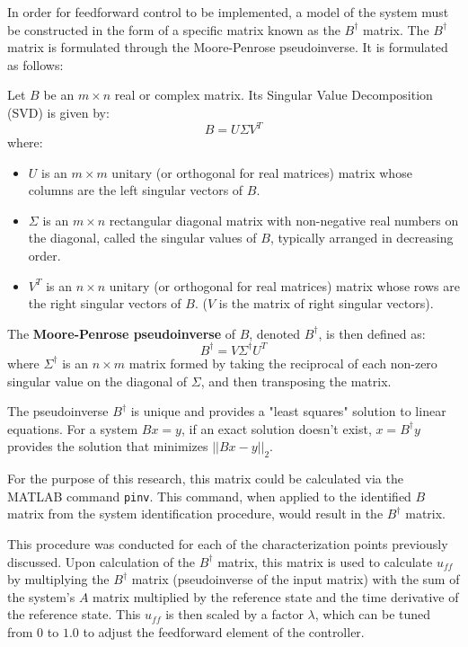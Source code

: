 In order for feedforward control to be implemented, a model of the system must be constructed in the form of a specific matrix known as the $B^\dagger$ matrix. The $B^\dagger$ matrix is formulated through the Moore-Penrose pseudoinverse. It is formulated as follows:

Let $B$ be an $m \times n$ real or complex matrix. Its Singular Value Decomposition (SVD) is given by:
$$B = U \Sigma V^T$$
where:
\begin{itemize}
    \item $U$ is an $m \times m$ unitary (or orthogonal for real matrices) matrix whose columns are the left singular vectors of $B$.
    \item $\Sigma$ is an $m \times n$ rectangular diagonal matrix with non-negative real numbers on the diagonal, called the singular values of $B$, typically arranged in decreasing order.
    \item $V^T$ is an $n \times n$ unitary (or orthogonal for real matrices) matrix whose rows are the right singular vectors of $B$. ($V$ is the matrix of right singular vectors).
\end{itemize}

The \textbf{Moore-Penrose pseudoinverse} of $B$, denoted $B^\dagger$, is then defined as:
$$B^\dagger = V \Sigma^\dagger U^T$$
where $\Sigma^\dagger$ is an $n \times m$ matrix formed by taking the reciprocal of each non-zero singular value on the diagonal of $\Sigma$, and then transposing the matrix.

The pseudoinverse $B^\dagger$ is unique and provides a "least squares" solution to linear equations. For a system $Bx = y$, if an exact solution doesn't exist, $x = B^\dagger y$ provides the solution that minimizes $||Bx - y||_2$.

For the purpose of this research, this matrix could be calculated via the MATLAB command \texttt{pinv}. This command, when applied to the identified $B$ matrix from the system identification procedure, would result in the $B^\dagger$ matrix.


This procedure was conducted for each of the characterization points previously discussed. Upon calculation of the $B^\dagger$ matrix, this matrix is used to calculate $u_{ff}$ by multiplying the $B^\dagger$ matrix (pseudoinverse of the input matrix) with the sum of the system's $A$ matrix multiplied by the reference state and the time derivative of the reference state. This $u_{ff}$ is then scaled by a factor $\lambda$, which can be tuned from $0$ to $1.0$ to adjust the feedforward element of the controller.

